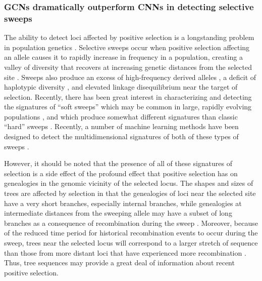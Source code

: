 \subsubsection{GCNs dramatically outperform CNNs in detecting selective sweeps}

The ability to detect loci affected by positive selection is a longstanding problem in population genetics \cite{stephanSelectiveSweeps2019}. Selective sweeps occur when positive selection affecting an allele causes it to rapidly increase in frequency in a population, creating a valley of diversity that recovers at increasing genetic distances from the selected site \cite{kaplanHitchhikingEffectRevisited1989,smithHitchhikingEffectFavourable1974}. Sweeps also produce an excess of high-frequency derived alleles \cite{fayHitchhikingPositiveDarwinian2000}, a deficit of haplotypic diversity \cite{fayHitchhikingPositiveDarwinian2000,hudsonEvidencePositiveSelection1994,sabetiDetectingRecentPositive2002}, and elevated linkage disequilibrium \cite{kellyTestNeutralityBased1997,kimLinkageDisequilibriumSignature2004} near the target of selection. Recently, there has been great interest in characterizing and detecting the signatures of “soft sweeps” \cite{hermissonSoftSweepsUnderstanding2017} which may be common in large, rapidly evolving populations \cite{garudRecentSelectiveSweeps2015,hermissonSoftSweeps2005,karasovEvidenceThatAdaptation2010}, and which produce somewhat different signatures than classic “hard” sweeps \cite{bergCoalescentModelSweep2015,przeworskiSignaturePositiveSelection2005}. Recently, a number of machine learning methods have been designed to detect the multidimensional signatures of both of these types of sweeps \cite{caldasInferenceSelectiveSweep2022,hejaseDeepLearningApproachInference2022,lauterburVersatileDetectionDiverse2022,mughalLocalizingClassifyingAdaptive2019,pybusHierarchicalBoostingMachinelearning2015,schriderHICRobustIdentification2016,whitehouseTimesweeperAccuratelyIdentifying2022,whitehouseTimesweeperAccuratelyIdentifying2023}. 

However, it should be noted that the presence of all of these signatures of selection is a side effect of the profound effect that positive selection has on genealogies in the genomic vicinity of the selected locus. The shapes and sizes of trees are affected by selection in that the genealogies of loci near the selected site have a very short branches, especially internal branches, while genealogies at intermediate distances from the sweeping allele may have a subset of long branches as a consequence of recombination during the sweep \cite{fayHitchhikingPositiveDarwinian2000,przeworskiSignaturePositiveSelection2005,stephanSelectiveSweeps2019}. Moreover, because of the reduced time period for historical recombination events to occur during the sweep, trees near the selected locus will correspond to a larger stretch of sequence than those from more distant loci that have experienced more recombination \cite{degiorgioSpatiallyAwareLikelihood2022,ferrer-admetllaDetectingIncompleteSoft2014,przeworskiSignaturePositiveSelection2005,sabetiDetectingRecentPositive2002}. Thus, tree sequences may provide a great deal of information about recent positive selection. 

